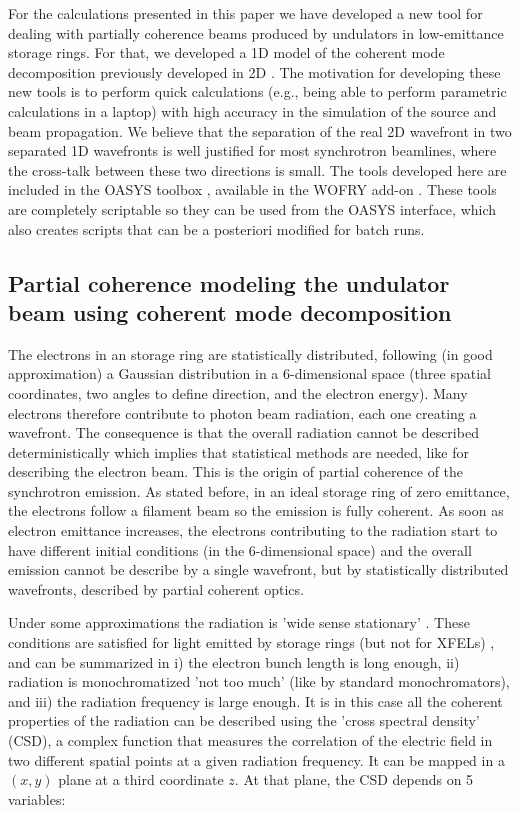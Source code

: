 \documentclass{iucr}              %
\begin{document}
For the calculations presented in this paper we have developed a new tool for dealing with partially coherence beams produced by undulators in low-emittance storage rings. For that, we developed a 1D model of the coherent mode decomposition previously developed in 2D \cite{glass2017}. The motivation for developing these new tools is to perform quick calculations (e.g., being able to perform parametric calculations in a laptop) with high accuracy in the simulation of the source and beam propagation. We believe that the separation of the real 2D wavefront in two separated 1D wavefronts is well justified for most synchrotron beamlines, where the cross-talk between these two directions is small. 
The tools developed here are included in the OASYS toolbox \cite{codeOASYS}, available in the WOFRY add-on \cite{XX}. These tools are completely scriptable so they can be used from the OASYS interface, which also creates scripts that can be a posteriori modified for batch runs. 

\subsection{Partial coherence modeling the undulator beam using coherent mode decomposition}

The electrons in an storage ring are statistically distributed, following (in good approximation) a Gaussian distribution in a 6-dimensional space (three spatial coordinates, two angles to define direction, and the electron energy). Many electrons therefore contribute to photon beam radiation, each one creating a wavefront. The consequence is that the overall radiation cannot be described deterministically which implies that statistical methods are needed, like for describing the electron beam. This is the origin of partial coherence of the synchrotron emission. As stated before, in an ideal storage ring of zero emittance, the electrons follow a filament beam so the emission is fully coherent. As soon as  electron emittance increases, the electrons contributing to the radiation start to have different initial conditions (in the 6-dimensional space) and the overall emission cannot be describe by a single wavefront, but by statistically distributed wavefronts, described by partial coherent optics.

Under some approximations the radiation is 'wide sense stationary' \cite{mandel_wolf}. These conditions are satisfied for light emitted by storage rings (but not for XFELs) \cite{geloni2008}, and can be summarized in
i) the electron bunch length is long enough,
ii) radiation is monochromatized 'not too much' (like by standard monochromators), and 
iii) the radiation frequency is large enough.
It is in this case all the coherent properties of the radiation can be described using the 'cross spectral density' (CSD), a complex function that measures the correlation of the electric field in two different spatial points at a given radiation frequency. It can be mapped in a $(x,y)$ plane at a third coordinate $z$. At that plane, the CSD depends on 5 variables: 
\end{document}
